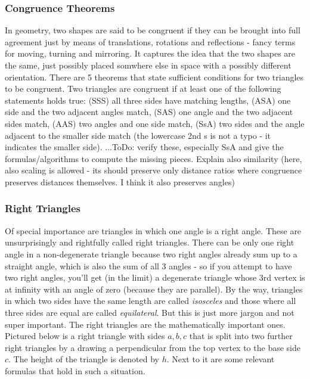 \subsubsection{Congruence Theorems}
In geometry, two shapes are said to be congruent if they can be brought into full agreement just by means of translations, rotations and reflections - fancy terms for moving, turning and mirroring. It captures the idea that the two shapes are the same, just possibly placed somwhere else in space with a possibly different orientation. There are 5 theorems that state sufficient conditions for two triangles to be congruent. Two triangles are congruent if at least one of the following statements holds true: (SSS) all three sides have matching lengths, (ASA) one side and the two adjacent angles match, (SAS) one angle and the two adjacent sides match, (AAS) two angles and one side match, (SsA) two sides and the angle adjacent to the smaller side match (the lowercase 2nd s is not a typo - it indicates the smaller side). ...ToDo: verify these, especially SsA and give the formulas/algorithms to compute the missing pieces. Explain also similarity (here, also scaling is allowed - its should preserve only distance ratios where congruence preserves distances themselves. I think it also preserves angles)




\subsubsection{Right Triangles}
Of special importance are triangles in which one angle is a right angle. These are unsurprisingly and rightfully called right triangles. There can be only one right angle in a non-degenerate triangle because two right angles already sum up to a straight angle, which is also the sum of all 3 angles - so if you attempt to have two right angles, you'll get (in the limit) a degenerate triangle whose 3rd vertex is at infinity with an angle of zero (because they are parallel). By the way, triangles in which two sides have the same length are called \emph{isosceles} and those where all three sides are equal are called \emph{equilateral}. But this is just more jargon and not super important. The right triangles are the mathematically important ones. Pictured below is a right triangle with sides $a,b,c$ that is split into two further right triangles by a drawing a perpendicular from the top vertex to the base side $c$. The height of the triangle is denoted by $h$. Next to it are some relevant formulas that hold in such a situation.


